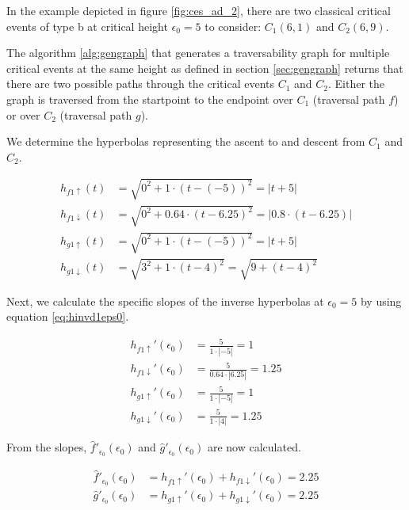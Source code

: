 In the example depicted in figure \ref{fig:ces_ad_2}, there are two classical critical events of type b at critical height $\epsilon_0 = 5$ to consider: $C_1(6, 1)$ and $C_2(6, 9)$.

The algorithm \ref{alg:gengraph} that generates a traversability graph for multiple critical events at the same height as defined in section \ref{sec:gengraph} returns that there are two possible paths through the critical events $C_1$ and $C_2$. Either the graph is traversed from the startpoint to the endpoint over $C_1$ (traversal path $f$) or over $C_2$ (traversal path $g$).

We determine the hyperbolas representing the ascent to and descent from $C_1$ and $C_2$.

\begin{align*}
	h_{f1\uparrow}(t) &= \sqrt{0^2 + 1\cdot(t - (-5))^2} = \left| t + 5 \right|\\
	h_{f1\downarrow}(t) &= \sqrt{0^2 + 0.64\cdot(t - 6.25)^2} = \left| 0.8\cdot(t - 6.25) \right|\\
	h_{g1\uparrow}(t) &= \sqrt{0^2 + 1\cdot(t - (-5))^2} = \left| t + 5 \right|\\
	h_{g1\downarrow}(t) &= \sqrt{3^2 + 1\cdot(t - 4)^2} = \sqrt{9 + (t - 4)^2}
\end{align*}

Next, we calculate the specific slopes of the inverse hyperbolas at $\epsilon_0 = 5$ by using equation \ref{eq:hinvd1eps0}.

\begin{align*}
	h_{f1\uparrow}'(\epsilon_0) &= \frac{5}{1\cdot\left|-5\right|} = 1\\
	h_{f1\downarrow}'(\epsilon_0) &= \frac{5}{0.64\cdot\left|6.25\right|} = 1.25\\
	h_{g1\uparrow}'(\epsilon_0) &= \frac{5}{1\cdot\left|-5\right|} = 1\\
	h_{g1\downarrow}'(\epsilon_0) &= \frac{5}{1\cdot\left|4\right|} = 1.25 
\end{align*}

From the slopes, $\hat{f}'_{\epsilon_0}(\epsilon_0)$ and $\hat{g}'_{\epsilon_0}(\epsilon_0)$ are now calculated.

\begin{align*}
	\hat{f}'_{\epsilon_0}(\epsilon_0) &= h_{f1\uparrow}'(\epsilon_0) + h_{f1\downarrow}'(\epsilon_0) = 2.25\\
	\hat{g}'_{\epsilon_0}(\epsilon_0) &= h_{g1\uparrow}'(\epsilon_0) + h_{g1\downarrow}'(\epsilon_0) = 2.25\\
\end{align*}

